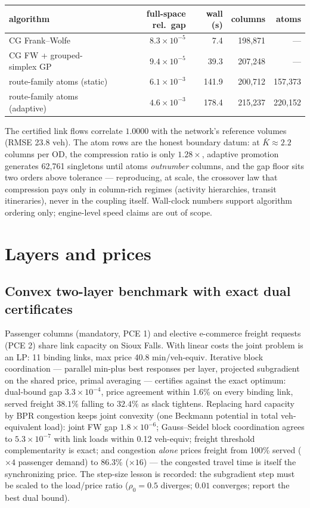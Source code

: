 \documentclass[11pt]{article}
\begin{document}
\begin{center}
\begin{tabular}{@{}lrrrr@{}}
\toprule
algorithm & full-space rel.\ gap & wall (s) & columns & atoms \\
\midrule
CG Frank--Wolfe & $8.3\times10^{-5}$ & 7.4 & 198{,}871 & --- \\
CG FW + grouped-simplex GP & $9.4\times10^{-5}$ & 39.3 & 207{,}248 & --- \\
route-family atoms (static) & $6.1\times10^{-3}$ & 141.9 & 200{,}712 & 157{,}373 \\
route-family atoms (adaptive) & $4.6\times10^{-3}$ & 178.4 & 215{,}237 & 220{,}152 \\
\bottomrule
\end{tabular}
\end{center}

\noindent The certified link flows correlate $1.0000$ with the
network's reference volumes (RMSE 23.8 veh). The atom rows are the
honest boundary datum: at $\bar K \approx 2.2$ columns per OD, the
compression ratio is only $1.28\times$, adaptive promotion generates
62{,}761 singletons until atoms \emph{outnumber} columns, and the gap
floor sits two orders above tolerance --- reproducing, at scale, the
crossover law that compression pays only in column-rich regimes
(activity hierarchies, transit itineraries), never in the coupling
itself. Wall-clock numbers support algorithm ordering only; engine-level
speed claims are out of scope.

\section{Layers and prices}

\subsection{Convex two-layer benchmark with exact dual certificates}

Passenger columns (mandatory, PCE 1) and elective e-commerce freight
requests (PCE 2) share link capacity on Sioux Falls. With linear costs
the joint problem is an LP: 11 binding links, max price 40.8
min/veh-equiv. Iterative block coordination --- parallel min-plus best
responses per layer, projected subgradient on the shared price, primal
averaging --- certifies against the exact optimum: dual-bound gap
$3.3\times10^{-4}$, price agreement within 1.6\% on every binding
link, served freight $38.1\%$ falling to $32.4\%$ as slack tightens.
Replacing hard capacity by BPR congestion keeps joint convexity (one
Beckmann potential in total veh-equivalent load): joint FW gap
$1.8\times10^{-6}$; Gauss--Seidel block coordination agrees to
$5.3\times10^{-7}$ with link loads within 0.12 veh-equiv; freight
threshold complementarity is exact; and congestion \emph{alone} prices
freight from 100\% served ($\times4$ passenger demand) to 86.3\%
($\times16$) --- the congested travel time is itself the synchronizing
price. The step-size lesson is recorded: the subgradient step must be
scaled to the load/price ratio ($\rho_0{=}0.5$ diverges; $0.01$
converges; report the best dual bound).
\end{document}
